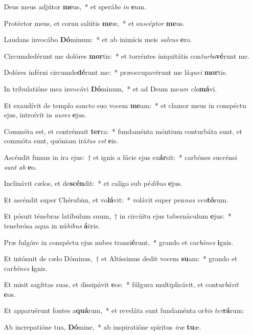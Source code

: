 \item Deus meus adjútor \textbf{me}us,~* et sperá\textit{bo} \textit{in} \textbf{e}um.
\item Protéctor meus, et cornu salútis \textbf{me}æ,~* et su\textit{scép}\textit{tor} \textbf{me}us.
\item Laudans invocábo \textbf{Dó}minum:~* et ab inimícis meis \textit{sal}\textit{vus} \textbf{e}ro.
\item Circumdedérunt me dolóres \textbf{mor}tis:~* et torréntes iniquitátis con\textit{tur}\textit{ba}\textbf{vé}runt me.
\item Dolóres inférni circumde\textbf{dé}runt me:~* præoccupavérunt me lá\textit{que}\textit{i} \textbf{mor}tis.
\item In tribulatióne mea invocávi \textbf{Dó}minum,~* et ad Deum me\textit{um} \textit{cla}\textbf{má}vi.
\item Et exaudívit de templo sancto suo vocem \textbf{me}am:~* et clamor meus in conspéctu ejus, introívit in \textit{au}\textit{res} \textbf{e}jus.
\item Commóta est, et contrémuit \textbf{ter}ra:~* fundaménta móntium conturbáta sunt, et commóta sunt, quóniam irá\textit{tus} \textit{est} \textbf{e}is.
\item Ascéndit fumus in ira ejus:~† et ignis a fácie ejus ex\textbf{ár}sit:~* carbónes succénsi \textit{sunt} \textit{ab} \textbf{e}o.
\item Inclinávit cælos, et de\textbf{scén}dit:~* et calígo sub pé\textit{di}\textit{bus} \textbf{e}jus.
\item Et ascéndit super Chérubim, et vo\textbf{lá}vit:~* volávit super pen\textit{nas} \textit{ven}\textbf{tó}rum.
\item Et pósuit ténebras latíbulum suum,~† in circúitu ejus tabernáculum \textbf{e}jus:~* tenebrósa aqua in nú\textit{bi}\textit{bus} \textbf{á}ëris.
\item Præ fulgóre in conspéctu ejus nubes transi\textbf{é}runt,~* grando et car\textit{bó}\textit{nes} \textbf{i}gnis.
\item Et intónuit de cælo Dóminus,~† et Altíssimus dedit vocem \textbf{su}am:~* grando et car\textit{bó}\textit{nes} \textbf{i}gnis.
\item Et misit sagíttas suas, et dissipávit \textbf{e}os:~* fúlgura multiplicávit, et contur\textit{bá}\textit{vit} \textbf{e}os.
\item Et apparuérunt fontes a\textbf{quá}rum,~* et reveláta sunt fundaménta or\textit{bis} \textit{ter}\textbf{rá}rum:
\item Ab increpatióne tua, \textbf{Dó}mine,~* ab inspiratióne spíritus \textit{i}\textit{ræ} \textbf{tu}æ.

